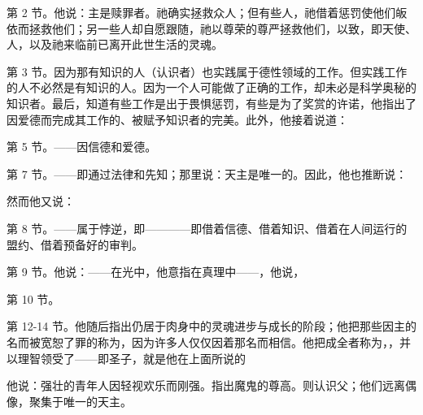 第 2 节。他说：主是赎罪者。祂确实拯救众人；但有些人，祂借着惩罚使他们皈依而拯救他们；另一些人却自愿跟随，祂以尊荣的尊严拯救他们，以致，即天使、人，以及祂来临前已离开此世生活的灵魂。\par

第 3 节。因为那有知识的人（认识者）也实践属于德性领域的工作。但实践工作的人不必然是有知识的人。因为一个人可能做了正确的工作，却未必是科学奥秘的知识者。最后，知道有些工作是出于畏惧惩罚，有些是为了奖赏的许诺，他指出了因爱德而完成其工作的、被赋予知识者的完美。此外，他接着说道：\par

第 5 节。——因信德和爱德。\par

第 7 节。——即通过法律和先知；那里说：天主是唯一的。因此，他也推断说：\par

然而他又说：\par

第 8 节。——属于悖逆，即————即借着信德、借着知识、借着在人间运行的盟约、借着预备好的审判。\par

第 9 节。他说：——在光中，他意指在真理中——，他说，\par

第 10 节。\par

第 12-14 节。他随后指出仍居于肉身中的灵魂进步与成长的阶段；他把那些因主的名而被宽恕了罪的称为，因为许多人仅仅因着那名而相信。他把成全者称为，，并以理智领受了——即圣子，就是他在上面所说的\par

他说：强壮的青年人因轻视欢乐而刚强。指出魔鬼的尊高。则认识父；他们远离偶像，聚集于唯一的天主。\par

